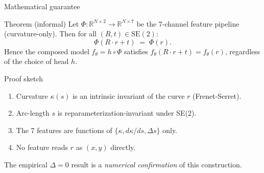 \documentclass[aspectratio=169,10pt]{beamer}
\begin{document}
\begin{frame}{Mathematical guarantee}
\begin{block}{Theorem (informal)}
\footnotesize
Let $\Phi: \mathbb{R}^{N \times 2} \to \mathbb{R}^{N \times 7}$ be the 7-channel feature pipeline (curvature-only). Then for all $(R, t) \in \mathrm{SE}(2)$:
\[
  \Phi(R \cdot r + t) \;=\; \Phi(r).
\]
Hence the composed model $f_\theta = h \circ \Phi$ satisfies $f_\theta(R \cdot r + t) = f_\theta(r)$, regardless of the choice of head $h$.
\end{block}

\begin{exampleblock}{Proof sketch}
\footnotesize
\begin{enumerate}
  \item Curvature $\kappa(s)$ is an intrinsic invariant of the curve $r$ (Frenet-Serret).
  \item Arc-length $s$ is reparameterization-invariant under SE(2).
  \item The 7 features are functions of $\{\kappa, d\kappa/ds, \Delta s\}$ only.
  \item No feature reads $r$ as $(x, y)$ directly.
\end{enumerate}
\end{exampleblock}

\centering\footnotesize
The empirical $\Delta = 0$ result is a \emph{numerical confirmation} of this construction.
\end{frame}
\end{document}
